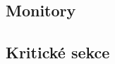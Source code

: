 \begin{compactitem}
    \item {}
\end{compactitem}

\subsection{Monitory}

\begin{compactitem}
    \item {}
\end{compactitem}

\subsection{Kritické sekce}

\begin{compactitem}
    \item {}
\end{compactitem}
